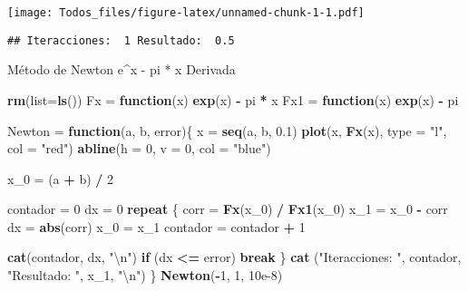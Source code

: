 \documentclass[]{article}
\newenvironment{Shaded}{\begin{snugshade}}{\end{snugshade}}
\newcommand{\CharTok}[1]{\textcolor[rgb]{0.31,0.60,0.02}{#1}}
\newcommand{\ControlFlowTok}[1]{\textcolor[rgb]{0.13,0.29,0.53}{\textbf{#1}}}
\newcommand{\DataTypeTok}[1]{\textcolor[rgb]{0.13,0.29,0.53}{#1}}
\newcommand{\DecValTok}[1]{\textcolor[rgb]{0.00,0.00,0.81}{#1}}
\newcommand{\FloatTok}[1]{\textcolor[rgb]{0.00,0.00,0.81}{#1}}
\newcommand{\KeywordTok}[1]{\textcolor[rgb]{0.13,0.29,0.53}{\textbf{#1}}}
\newcommand{\NormalTok}[1]{#1}
\newcommand{\OperatorTok}[1]{\textcolor[rgb]{0.81,0.36,0.00}{\textbf{#1}}}
\newcommand{\StringTok}[1]{\textcolor[rgb]{0.31,0.60,0.02}{#1}}
\begin{document}
\texttt{[image: Todos\_files/figure-latex/unnamed-chunk-1-1.pdf]}

\begin{verbatim}
## Iteracciones:  1 Resultado:  0.5
\end{verbatim}

Método de Newton e\^{}x - pi * x Derivada

\begin{Shaded}
\begin{Highlighting}[]
\KeywordTok{rm}\NormalTok{(}\DataTypeTok{list=}\KeywordTok{ls}\NormalTok{())}
\NormalTok{Fx =}\StringTok{ }\ControlFlowTok{function}\NormalTok{(x) }\KeywordTok{exp}\NormalTok{(x) }\OperatorTok{-}\StringTok{ }\NormalTok{pi }\OperatorTok{*}\StringTok{ }\NormalTok{x}
\NormalTok{Fx1 =}\StringTok{ }\ControlFlowTok{function}\NormalTok{(x) }\KeywordTok{exp}\NormalTok{(x) }\OperatorTok{-}\StringTok{ }\NormalTok{pi}

\NormalTok{Newton =}\StringTok{ }\ControlFlowTok{function}\NormalTok{(a, b, error)\{}
\NormalTok{  x =}\StringTok{ }\KeywordTok{seq}\NormalTok{(a, b, }\FloatTok{0.1}\NormalTok{)}
  \KeywordTok{plot}\NormalTok{(x, }\KeywordTok{Fx}\NormalTok{(x), }\DataTypeTok{type =} \StringTok{"l"}\NormalTok{, }\DataTypeTok{col =} \StringTok{"red"}\NormalTok{)}
  \KeywordTok{abline}\NormalTok{(}\DataTypeTok{h =} \DecValTok{0}\NormalTok{, }\DataTypeTok{v =} \DecValTok{0}\NormalTok{, }\DataTypeTok{col =} \StringTok{"blue"}\NormalTok{)}
  
\NormalTok{  x_}\DecValTok{0}\NormalTok{ =}\StringTok{ }\NormalTok{(a }\OperatorTok{+}\StringTok{ }\NormalTok{b) }\OperatorTok{/}\StringTok{ }\DecValTok{2}
  
\NormalTok{  contador =}\StringTok{ }\DecValTok{0}
\NormalTok{  dx =}\StringTok{ }\DecValTok{0}
  \ControlFlowTok{repeat}\NormalTok{ \{}
\NormalTok{    corr =}\StringTok{ }\KeywordTok{Fx}\NormalTok{(x_}\DecValTok{0}\NormalTok{) }\OperatorTok{/}\StringTok{ }\KeywordTok{Fx1}\NormalTok{(x_}\DecValTok{0}\NormalTok{)}
\NormalTok{    x_}\DecValTok{1}\NormalTok{ =}\StringTok{ }\NormalTok{x_}\DecValTok{0} \OperatorTok{-}\StringTok{ }\NormalTok{corr}
\NormalTok{    dx =}\StringTok{ }\KeywordTok{abs}\NormalTok{(corr)}
\NormalTok{    x_}\DecValTok{0}\NormalTok{ =}\StringTok{ }\NormalTok{x_}\DecValTok{1}
\NormalTok{    contador =}\StringTok{ }\NormalTok{contador }\OperatorTok{+}\StringTok{ }\DecValTok{1}
    
    \KeywordTok{cat}\NormalTok{(contador, dx, }\StringTok{"}\CharTok{\textbackslash{}n}\StringTok{"}\NormalTok{)}
    \ControlFlowTok{if}\NormalTok{ (dx }\OperatorTok{<=}\StringTok{ }\NormalTok{error)}
      \ControlFlowTok{break}
\NormalTok{  \}}
  \KeywordTok{cat}\NormalTok{ (}\StringTok{"Iteracciones: "}\NormalTok{, contador, }\StringTok{"Resultado: "}\NormalTok{, x_}\DecValTok{1}\NormalTok{, }\StringTok{"}\CharTok{\textbackslash{}n}\StringTok{"}\NormalTok{)}
\NormalTok{\}}
\KeywordTok{Newton}\NormalTok{(}\OperatorTok{-}\DecValTok{1}\NormalTok{, }\DecValTok{1}\NormalTok{, }\FloatTok{10e-8}\NormalTok{)}
\end{Highlighting}
\end{Shaded}
\end{document}
